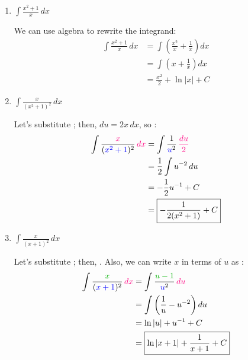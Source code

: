 \documentclass{article}
\begin{document}
\begin{enumerate}
\begin{enumerate}
    \item
      \begin{problem}[\vfill]
        $\displaystyle \int \frac{x^2 +1}{x} \,dx$
      \end{problem}

      \begin{solution}
        We can use algebra to rewrite the integrand:
        \begin{align*}
          \int \frac{x^2 + 1}{x}\,dx &= \int \left( \frac{x^2}{x} +
            \frac{1}{x} \right) dx \\
          &= \int \left( x + \frac{1}{x} \right) dx \\
          &= \boxed{\frac{x^2}{2} + \ln |x| + C}
        \end{align*}
      \end{solution}

    \item
      \begin{problem}[\vfill]
        $\displaystyle \int \frac{x}{(x^2+1)^2}\,dx$
      \end{problem}

      \begin{solution}
        Let's substitute ; then, $du = 2x\,dx$, so
        :
        \begin{align*}
          \int \frac{\subd{x}}{(\sub{x^2+1})^2}\,\subd{dx} &= \int
          \frac{1}{\sub{u}^2}\,\subd{\frac{du}{2}} \\
          &= \frac{1}{2} \int u^{-2}\,du \\
          &= - \frac{1}{2} u^{-1} + C \\
          &= \boxed{- \frac{1}{2 (x^2 + 1)} + C}
        \end{align*}
      \end{solution}

    \item
      \begin{problem}[\vfill\newpage]
        $\displaystyle \int \frac{x}{(x+ 1)^2}\,dx$ %
      \end{problem}

      \begin{solution}
        Let's substitute ; then, .  Also,
        we can write $x$ in terms of $u$ as :
        \begin{align*}
          \int \frac{\sube{x}}{(\sub{x+ 1})^2}\,\subd{dx} &= \int
          \frac{\sube{u - 1}}{\sub{u}^2}\,\subd{du} \\ 
          &= \int \left( \frac{1}{u} - u^{-2} \right) du \\
          &= \ln |u| + u^{-1} + C \\
          &= \boxed{\ln |x + 1| + \frac{1}{x + 1} + C}
        \end{align*}
      \end{solution}


\end{enumerate}
\end{enumerate}
\end{document}
